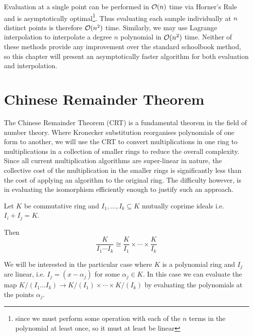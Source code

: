 \medskip

Evaluation at a single point can be performed in $\mathcal O(n)$ time via Horner's Rule and is asymptotically optimal\footnote{since we must perform some operation with each of the $n$ terms in the polynomial at least once, so it must at least be linear}. Thus evaluating each sample individually at $n$ distinct points is therefore $\mathcal O(n^2)$ time. Similarly, we may use Lagrange interpolation to interpolate a degree $n$ polynomial in $\mathcal O(n^2)$ time. Neither of these methods provide any improvement over the standard schoolbook method, so this chapter will present an asymptotically faster algorithm for both evaluation and interpolation.

\section{Chinese Remainder Theorem}%
\label{sec:crt}

The Chinese Remainder Theorem (CRT) is a fundamental theorem in the field of number theory. Where Kronecker substitution reorganises polynomials of one form to another, we will use the CRT to convert multiplications in one ring to multiplications in a collection of smaller rings to reduce the overall complexity. Since all current multiplication algorithms are super-linear in nature, the collective cost of the multiplication in the smaller rings is significantly less than the cost of applying an algorithm to the original ring. The difficulty however, is in evaluating the isomorphism efficiently enough to justify such an approach.

\begin{theorem}\label{thm:crt}
    Let $K$ be commutative ring and $I_1, \ldots, I_k \subseteq K$ mutually coprime ideals i.e. $I_i + I_j = K$.

    Then
    \[
        \frac{K}{I_1\cdots I_k} \cong \frac{K}{I_1} \times \cdots \times \frac{K}{I_k}
    \]
\end{theorem}

\medskip

We will be interested in the particular case where $K$ is a polynomial ring and $I_j$ are linear, i.e. $I_j = (x - \alpha_j)$ for some $\alpha_j \in K$. In this case we can evaluate the map $K/(I_1\ldots I_k) \to K/(I_1) \times \cdots \times K/(I_k)$ by evaluating the polynomials at the points $\alpha_j$.

